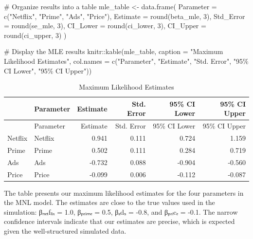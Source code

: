 \documentclass[
  letterpaper,
  DIV=11,
  numbers=noendperiod]{scrartcl}
\newenvironment{Shaded}{\begin{snugshade}}{\end{snugshade}}
\newcommand{\AttributeTok}[1]{\textcolor[rgb]{0.40,0.45,0.13}{#1}}
\newcommand{\CommentTok}[1]{\textcolor[rgb]{0.37,0.37,0.37}{#1}}
\newcommand{\DecValTok}[1]{\textcolor[rgb]{0.68,0.00,0.00}{#1}}
\newcommand{\FunctionTok}[1]{\textcolor[rgb]{0.28,0.35,0.67}{#1}}
\newcommand{\NormalTok}[1]{\textcolor[rgb]{0.00,0.23,0.31}{#1}}
\newcommand{\OtherTok}[1]{\textcolor[rgb]{0.00,0.23,0.31}{#1}}
\newcommand{\SpecialCharTok}[1]{\textcolor[rgb]{0.37,0.37,0.37}{#1}}
\newcommand{\StringTok}[1]{\textcolor[rgb]{0.13,0.47,0.30}{#1}}
\begin{document}
\begin{Shaded}
\begin{Highlighting}[]
\CommentTok{\# Organize results into a table}
\NormalTok{mle\_table }\OtherTok{\textless{}{-}} \FunctionTok{data.frame}\NormalTok{(}
  \AttributeTok{Parameter =} \FunctionTok{c}\NormalTok{(}\StringTok{"Netflix"}\NormalTok{, }\StringTok{"Prime"}\NormalTok{, }\StringTok{"Ads"}\NormalTok{, }\StringTok{"Price"}\NormalTok{),}
  \AttributeTok{Estimate =} \FunctionTok{round}\NormalTok{(beta\_mle, }\DecValTok{3}\NormalTok{),}
  \AttributeTok{Std\_Error =} \FunctionTok{round}\NormalTok{(se\_mle, }\DecValTok{3}\NormalTok{),}
  \AttributeTok{CI\_Lower =} \FunctionTok{round}\NormalTok{(ci\_lower, }\DecValTok{3}\NormalTok{),}
  \AttributeTok{CI\_Upper =} \FunctionTok{round}\NormalTok{(ci\_upper, }\DecValTok{3}\NormalTok{)}
\NormalTok{)}

\CommentTok{\# Display the MLE results}
\NormalTok{knitr}\SpecialCharTok{::}\FunctionTok{kable}\NormalTok{(mle\_table, }
             \AttributeTok{caption =} \StringTok{"Maximum Likelihood Estimates"}\NormalTok{,}
             \AttributeTok{col.names =} \FunctionTok{c}\NormalTok{(}\StringTok{"Parameter"}\NormalTok{, }\StringTok{"Estimate"}\NormalTok{, }\StringTok{"Std. Error"}\NormalTok{, }\StringTok{"95\% CI Lower"}\NormalTok{, }\StringTok{"95\% CI Upper"}\NormalTok{))}
\end{Highlighting}
\end{Shaded}

\begin{longtable}[]{@{}llrrrr@{}}
\caption{Maximum Likelihood Estimates}\tabularnewline
\toprule\noalign{}
& Parameter & Estimate & Std. Error & 95\% CI Lower & 95\% CI Upper \\
\midrule\noalign{}
\endfirsthead
\toprule\noalign{}
& Parameter & Estimate & Std. Error & 95\% CI Lower & 95\% CI Upper \\
\midrule\noalign{}
\endhead
\bottomrule\noalign{}
\endlastfoot
Netflix & Netflix & 0.941 & 0.111 & 0.724 & 1.159 \\
Prime & Prime & 0.502 & 0.111 & 0.284 & 0.719 \\
Ads & Ads & -0.732 & 0.088 & -0.904 & -0.560 \\
Price & Price & -0.099 & 0.006 & -0.112 & -0.087 \\
\end{longtable}

The table presents our maximum likelihood estimates for the four
parameters in the MNL model. The estimates are close to the true values
used in the simulation: βₙₑₜfₗᵢₓ = 1.0, βₚᵣᵢₘₑ = 0.5, βₐdₛ = -0.8, and
βₚᵣᵢcₑ = -0.1. The narrow confidence intervals indicate that our
estimates are precise, which is expected given the well-structured
simulated data.
\end{document}
